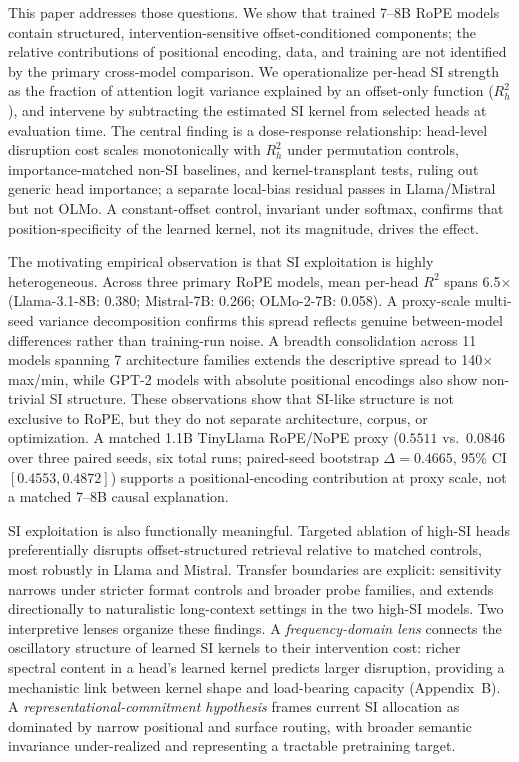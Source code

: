 \documentclass{article}
\begin{document}
This paper addresses those questions.
We show that trained 7--8B RoPE models contain structured, intervention-sensitive offset-conditioned components; the relative contributions of positional encoding, data, and training are not identified by the primary cross-model comparison.
We operationalize per-head SI strength as the fraction of attention logit variance explained by an offset-only function ($R_h^2$), and intervene by subtracting the estimated SI kernel from selected heads at evaluation time.
The central finding is a dose-response relationship: head-level disruption cost scales monotonically with $R_h^2$ under permutation controls, importance-matched non-SI baselines, and kernel-transplant tests, ruling out generic head importance; a separate local-bias residual passes in Llama/Mistral but not OLMo.
A constant-offset control, invariant under softmax, confirms that position-specificity of the learned kernel, not its magnitude, drives the effect.

The motivating empirical observation is that SI exploitation is highly heterogeneous.
Across three primary RoPE models, mean per-head $R^2$ spans 6.5$\times$ (Llama-3.1-8B: 0.380; Mistral-7B: 0.266; OLMo-2-7B: 0.058).
A proxy-scale multi-seed variance decomposition confirms this spread reflects genuine between-model differences rather than training-run noise.
A breadth consolidation across 11 models spanning 7 architecture families extends the descriptive spread to 140$\times$ max/min, while GPT-2 models with absolute positional encodings also show non-trivial SI structure.
These observations show that SI-like structure is not exclusive to RoPE, but they do not separate architecture, corpus, or optimization.
A matched 1.1B TinyLlama RoPE/NoPE proxy ($0.5511$ vs.\ $0.0846$ over three paired seeds, six total runs; paired-seed bootstrap $\Delta=0.4665$, 95\% CI $[0.4553,0.4872]$) supports a positional-encoding contribution at proxy scale, not a matched 7--8B causal explanation.

SI exploitation is also functionally meaningful.
Targeted ablation of high-SI heads preferentially disrupts offset-structured retrieval relative to matched controls, most robustly in Llama and Mistral.
Transfer boundaries are explicit: sensitivity narrows under stricter format controls and broader probe families, and extends directionally to naturalistic long-context settings in the two high-SI models.
Two interpretive lenses organize these findings.
A \textit{frequency-domain lens} connects the oscillatory structure of learned SI kernels to their intervention cost: richer spectral content in a head's learned kernel predicts larger disruption, providing a mechanistic link between kernel shape and load-bearing capacity (Appendix~B).
A \textit{representational-commitment hypothesis} frames current SI allocation as dominated by narrow positional and surface routing, with broader semantic invariance under-realized and representing a tractable pretraining target.
\end{document}
